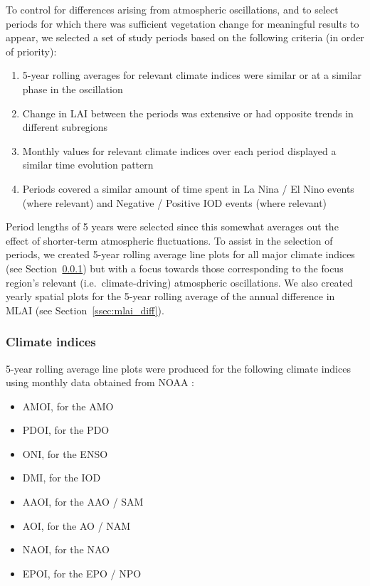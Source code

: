 To control for differences arising from atmospheric oscillations, and to select periods for which there was sufficient vegetation change for meaningful results to appear, we selected a set of study periods based on the following criteria (in order of priority):
\begin{enumerate}
	\item 5-year rolling averages for relevant climate indices were similar or at a similar phase in the oscillation
	\item Change in \ac{LAI} between the periods was extensive or had opposite trends in different subregions
	\item Monthly values for relevant climate indices over each period displayed a similar time evolution pattern
	\item Periods covered a similar amount of time spent in La Nina / El Nino events (where relevant) and Negative / Positive \ac{IOD} events (where relevant)
\end{enumerate}

Period lengths of 5 years were selected since this somewhat averages out the effect of shorter-term atmospheric fluctuations. To assist in the selection of periods, we created 5-year rolling average line plots for all major climate indices (see Section~\ref{ssec:indices}) but with a focus towards those corresponding to the focus region's relevant (i.e.\ climate-driving) atmospheric oscillations. We also created yearly spatial plots for the 5-year rolling average of the annual difference in \ac{MLAI} (see Section~\ref{ssec:mlai_diff}).

\subsubsection{Climate indices}
\label{ssec:indices}

5-year rolling average line plots were produced for the following climate indices using monthly data obtained from \ac{NOAA} \citep{ind_source}:
\begin{itemize}
	\item \ac{AMOI}, for the \ac{AMO}
	\item \ac{PDOI}, for the \ac{PDO}
	\item \ac{ONI}, for the \ac{ENSO}
	\item \ac{DMI}, for the \ac{IOD}
	\item \ac{AAOI}, for the \ac{AAO} / \ac{SAM}
	\item \ac{AOI}, for the \ac{AO} / \ac{NAM}
	\item \ac{NAOI}, for the \ac{NAO}
	\item \ac{EPOI}, for the \ac{EPO} / \ac{NPO}
\end{itemize}

